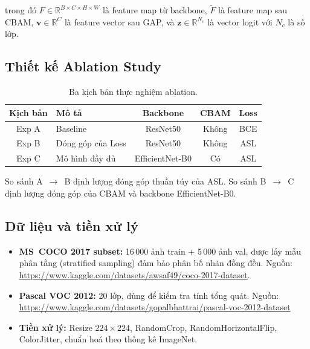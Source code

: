 \documentclass{article}
\begin{document}
\noindent trong đó $F \in \mathbb{R}^{B \times C \times H \times W}$ là feature
map từ backbone, $\tilde{F}$ là feature map sau CBAM, $\mathbf{v} \in \mathbb{R}^{C}$
là feature vector sau GAP, và $\mathbf{z} \in \mathbb{R}^{N_c}$ là vector logit
với $N_c$ là số lớp.

\subsection{Thiết kế Ablation Study}

\begin{table}[H]
  \caption{Ba kịch bản thực nghiệm ablation.}
  \label{tab:ablation}
  \centering
  \begin{tabular}{clccc}
    \toprule
    \textbf{Kịch bản} & \textbf{Mô tả} & \textbf{Backbone} & \textbf{CBAM} & \textbf{Loss} \\
    \midrule
    Exp A & Baseline          & ResNet50        & Không & BCE \\
    Exp B & Đóng góp của Loss       & ResNet50        & Không & ASL \\
    Exp C & Mô hình đầy đủ   & EfficientNet-B0 & Có    & ASL \\
    \bottomrule
  \end{tabular}
\end{table}

\noindent So sánh A~$\to$~B định lượng đóng góp thuần túy của ASL.
So sánh B~$\to$~C định lượng đóng góp của CBAM và backbone EfficientNet-B0.

\subsection{Dữ liệu và tiền xử lý}

\begin{itemize}[leftmargin=1.8em]
  \item \textbf{MS~COCO 2017 subset:} 16\,000 ảnh train + 5\,000 ảnh val,
        được lấy mẫu phân tầng (stratified sampling) đảm bảo phân bố nhãn
        đồng đều. Nguồn: \url{https://www.kaggle.com/datasets/awsaf49/coco-2017-dataset}.
  \item \textbf{Pascal VOC 2012:} 20 lớp, dùng để kiểm tra tính tổng quát. Nguồn: \url{https://www.kaggle.com/datasets/gopalbhattrai/pascal-voc-2012-dataset}
  \item \textbf{Tiền xử lý:} Resize $224\times224$, RandomCrop, RandomHorizontalFlip,
        ColorJitter, chuẩn hoá theo thống kê ImageNet.
\end{itemize}
\end{document}
